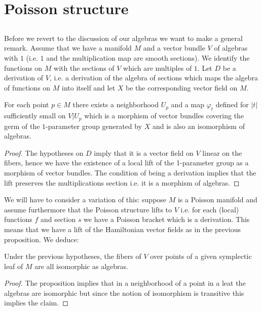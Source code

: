 \section{Poisson structure}\label{chap4-sec-4}

\subsection{}\label{chap4-subsec-4.1}
Before we revert to the discussion of our algebras we want to make a general remark. Assume that we have a manifold $M$ and a vector bundle $V$ of algebras with $1$ (i.e. $1$ and the multiplication map are smooth sections). We identify the functions on $M$ with the sections of $V$ which are multiples of $1$.
Let $D$ be a derivation of $V$, i.e. a derivation of the algebra of sections which maps the algebra of functions on $M$ into itself and  let $X$ be the corresponding vector field on $M$. 

\begin{prop*}
For each point $p\in M $ there exists a neighborhood $U_{p}$ and a map $\varphi_{t}$ defined for $|t|$ sufficiently small on $V|U_{p}$ which is a morphism of vector bundles covering the germ of the $1$-parameter group generated by $X$ and is also an isomorphism of algebras.
\end{prop*}

\begin{proof}
The hypotheses on $D$ imply that it is a vector field on $V$ linear on the fibers, hence we have the existence of a local lift of the 1-parameter group as a morphism of vector bundles. The condition of being a derivation implies that the lift preserves the multiplications section i.e. it is a morphism of algebras.
\end{proof}

We will have to consider a variation of this: suppose $M$ is a Poisson manifold and assume furthermore that the Poisson structure lifts to $V$ i.e. for each (local) functions $f$ and section $s$ we have a  Poisson bracket which is a derivation. This means that we have a lift of the Hamiltonian vector fields as in the previous proposition. We deduce: 

\begin{coro*}
Under the previous hypotheses, the fibers of $V$ over points of a given symplectic leaf of $M$ are all isomorphic as algebras. 
\end{coro*}

\begin{proof}
The proposition implies that in a neighborhood of a point  in a leat the algebras are isomorphic but since the notion of isomorphism is transitive this implies the claim.
\end{proof}


